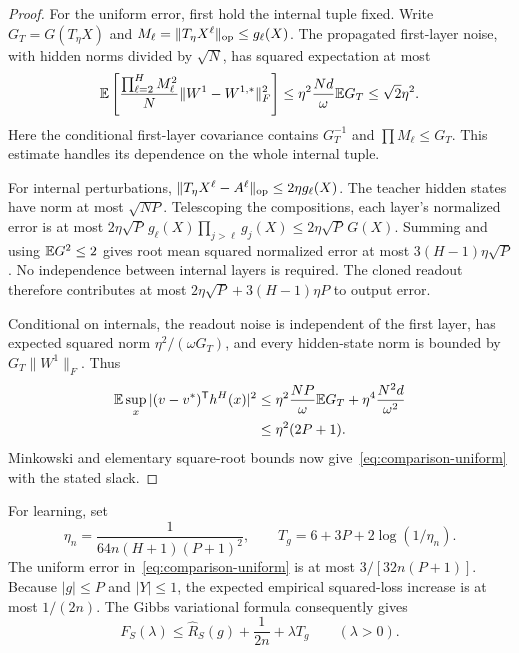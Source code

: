\begin{proof}
For the uniform error, first hold the internal tuple fixed. Write $G_T=G(T_\eta X)$ and $M_\ell=\|T_\eta X^\ell\|_{\mathrm{op}}\le g_\ell(X)$. The propagated first-layer noise, with hidden norms divided by $\sqrt N$, has squared expectation at most
\[
 \mathbb E\left[\frac{\prod_{\ell=2}^HM_\ell^2}{N}
                  \|W^1-W^{1,*}\|_F^2\right]
 \le\eta^2\frac{Nd}{\omega}\mathbb E G_T\le\sqrt2\eta^2.
\]
Here the conditional first-layer covariance contains $G_T^{-1}$ and $\prod M_\ell\le G_T$. This estimate handles its dependence on the whole internal tuple.

For internal perturbations,
$\|T_\eta X^\ell-A^\ell\|_{\mathrm{op}}\le2\eta g_\ell(X)$.
The teacher hidden states have norm at most $\sqrt{NP}$. Telescoping the compositions, each layer's normalized error is at most
$2\eta\sqrt P\,g_\ell(X)\prod_{j>\ell}g_j(X)\le2\eta\sqrt P\,G(X)$.
Summing and using $\mathbb E G^2\le2$ gives root mean squared normalized error at most $3(H-1)\eta\sqrt P$. No independence between internal layers is required. The cloned readout therefore contributes at most
$2\eta\sqrt P+3(H-1)\eta P$ to output error.

Conditional on internals, the readout noise is independent of the first layer, has expected squared norm $\eta^2/(\omega G_T)$, and every hidden-state norm is bounded by $G_T\|W^1\|_F$. Thus
\begin{align*}
 \mathbb E\sup_x|(v-v^*)^{\mathsf T}h^H(x)|^2
 &\le\eta^2\frac{NP}{\omega}\mathbb E G_T
             +\eta^4\frac{N^2d}{\omega^2}\\
 &\le\eta^2(2P+1).
\end{align*}
Minkowski and elementary square-root bounds now give~\eqref{eq:comparison-uniform} with the stated slack.
\end{proof}

For learning, set
\begin{equation}
 \eta_n=\frac1{64n(H+1)(P+1)^2},\qquad
 T_g=6+3P+2\log(1/\eta_n).
 \label{eq:teacher-budget}
\end{equation}
The uniform error in~\eqref{eq:comparison-uniform} is at most $3/[32n(P+1)]$. Because $|g|\le P$ and $|Y|\le1$, the expected empirical squared-loss increase is at most $1/(2n)$. The Gibbs variational formula consequently gives
\begin{equation}
 F_S(\lambda)\le\widehat R_S(g)+\frac1{2n}+\lambda T_g
 \qquad(\lambda>0).
 \label{eq:free-energy-comparison}
\end{equation}
